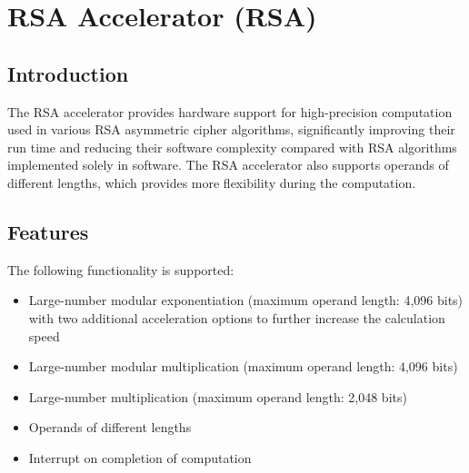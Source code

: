 \documentclass[main\_\_EN.tex]{subfiles}
\begin{document}
\setenglishformatting

\ifglobal
\else
    \clearpage
    \listoftodos
    \listofdonetodos
    \tableofcontents
\fi



\hypertarget{rsa}{}
\chapter{RSA Accelerator (RSA)}\label{mod:rsa}
\section{Introduction}

The RSA accelerator provides hardware support for high-precision computation used in various RSA asymmetric cipher algorithms, significantly improving their run time and reducing their software complexity compared with RSA algorithms implemented solely in software. The RSA accelerator also supports operands of different lengths, which provides more flexibility during the computation.


\section{Features}

The following functionality is supported:

\begin{itemize}
    \item Large-number modular exponentiation (maximum operand length: 4,096 bits) with two additional acceleration options to further increase the calculation speed
    \item Large-number modular multiplication (maximum operand length: 4,096 bits)
    \item Large-number multiplication (maximum operand length: 2,048 bits)
    \item Operands of different lengths
    \item Interrupt on completion of computation
\end{itemize}
\end{document}
